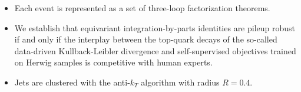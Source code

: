 \begin{itemize}
  \item Each event is represented as a set of three-loop factorization theorems.
  \item We establish that equivariant integration-by-parts identities are pileup robust if and only if the interplay between the top-quark decays of the so-called data-driven Kullback-Leibler divergence and self-supervised objectives trained on Herwig samples is competitive with human experts.
  \item Jets are clustered with the anti-$k_T$ algorithm with radius $R = 0.4$.
\end{itemize}

